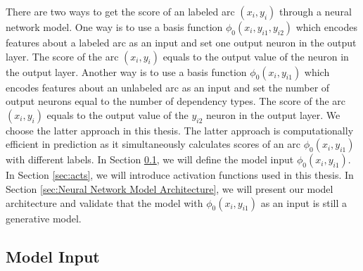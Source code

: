 There are two ways to get the score of an labeled arc $(x_i,y_i)$ through a neural network model. One way is to use a basis function $\phi_0(x_i,y_{i1},y_{i2})$ which encodes features about a labeled arc as an input and set one output neuron in the output layer. The score of the arc $(x_i,y_i)$ equals to the output value of the neuron in the output layer. Another way is to use a basis function $\phi_0(x_i,y_{i1})$ which encodes features about an unlabeled arc as an input and set the number of output neurons equal to the number of dependency types. The score of the arc $(x_i,y_i)$ equals to the output value of the $y_{i2}$ neuron in the output layer. We choose the latter approach in this thesis. The latter approach is computationally efficient in prediction as it simultaneously calculates scores of an arc $\phi_0(x_i,y_{i1})$ with different labels. In Section \ref{sec:wordemb}, we will define the model input $\phi_0(x_i,y_{i1})$. In Section \ref{sec:acts}, we will introduce activation functions used in this thesis. In Section \ref{sec:Neural Network Model Architecture}, we will present our model architecture and validate that the model with $\phi_0(x_i,y_{i1})$ as an input is still a generative model.

\subsection{Model Input}
\label{sec:wordemb}
